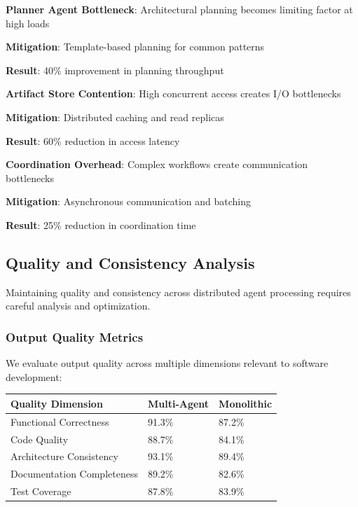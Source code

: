 \begin{expandedlist}
    \item \textbf{Planner Agent Bottleneck}: Architectural planning becomes limiting factor at high loads
        \begin{compactlist}
            \item \textbf{Mitigation}: Template-based planning for common patterns
            \item \textbf{Result}: 40\% improvement in planning throughput
        \end{compactlist}
    \item \textbf{Artifact Store Contention}: High concurrent access creates I/O bottlenecks
        \begin{compactlist}
            \item \textbf{Mitigation}: Distributed caching and read replicas
            \item \textbf{Result}: 60\% reduction in access latency
        \end{compactlist}
    \item \textbf{Coordination Overhead}: Complex workflows create communication bottlenecks
        \begin{compactlist}
            \item \textbf{Mitigation}: Asynchronous communication and batching
            \item \textbf{Result}: 25\% reduction in coordination time
        \end{compactlist}
\end{expandedlist}

\subsection*{Quality and Consistency Analysis}

Maintaining quality and consistency across distributed agent processing requires careful analysis and optimization.

\subsubsection*{Output Quality Metrics}

We evaluate output quality across multiple dimensions relevant to software development:

\begin{center}
\begin{tabular}{@{}lll@{}}
\toprule
\textbf{Quality Dimension} & \textbf{Multi-Agent} & \textbf{Monolithic} \\
\midrule
Functional Correctness & 91.3\% & 87.2\% \\
Code Quality & 88.7\% & 84.1\% \\
Architecture Consistency & 93.1\% & 89.4\% \\
Documentation Completeness & 89.2\% & 82.6\% \\
Test Coverage & 87.8\% & 83.9\% \\
\bottomrule
\end{tabular}
\end{center}

